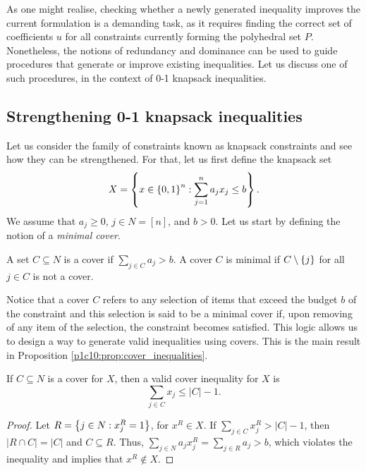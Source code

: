 As one might realise, checking whether a newly generated inequality improves the current formulation is a demanding task, as it requires finding the correct set of coefficients $u$ for all constraints currently forming the polyhedral set $P$. Nonetheless, the notions of redundancy and dominance can be used to guide procedures that generate or improve existing inequalities. Let us discuss one of such procedures, in the context of 0-1 knapsack inequalities.


\subsection{Strengthening 0-1 knapsack inequalities}

Let us consider the family of constraints known as knapsack constraints and see how they can be strengthened. For that, let us first define the knapsack set
%
\begin{equation*}
	X = \left\{ x \in \left\{ 0,1 \right \}^n : \sum_{j=1}^n a_jx_j \leq b \right \}.	
\end{equation*}
%
We assume that $a_j \geq 0$, $j \in N = [n]$, and $b > 0$. Let us start by defining the notion of a \emph{minimal cover}.

\begin{definition}  \label{p1c10:def:minimal_cover}
	A set $C \subseteq N$ is a cover if $\sum_{j \in C} a_j > b$. A cover $C$ is minimal if $C \setminus \left\{ j \right \}$ for all $j \in C$ is not a cover.  
\end{definition} 

Notice that a cover $C$ refers to any selection of items that exceed the budget $b$ of the constraint and this selection is said to be a minimal cover if, upon removing of any item of the selection, the constraint becomes satisfied. This logic allows us to design a way to generate valid inequalities using covers. This is the main result in Proposition \ref{p1c10:prop:cover_inequalities}.

\begin{proposition} \label{p1c10:prop:cover_inequalities}
	If $C \subseteq N$ is a cover for $X$, then a valid cover inequality for $X$ is
	\begin{equation*}
		\sum_{j \in C} x_j \leq |C|-1.		
	\end{equation*}
\end{proposition}

\begin{proof} 
	Let $R = \left\{ j \in N : x^R_j = 1 \right \}$, for $x^R \in X$. If $\sum_{j \in C}x_j^R > |C|-1$, then $|R \cap C| = |C|$ and $C \subseteq R$. Thus, $\sum_{j\in N}a_j x_j^R = \sum_{j\in R}a_j > b$, which violates the inequality and implies that $x^R \notin X$.  
\end{proof}

